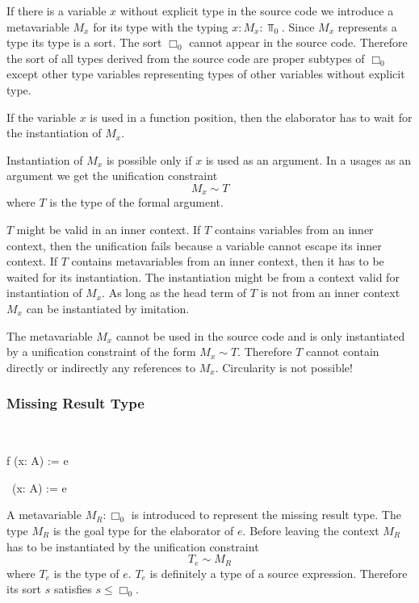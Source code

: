 If there is a variable $x$ without explicit type in the source code we introduce
a metavariable $M_x$ for its type with the typing $x : M_x : \Top_0$. Since
$M_x$ represents a type its type is a sort. The sort $\Box_0$ cannot appear in
the source code. Therefore the sort of all types derived from the source code
are proper subtypes of $\Box_0$ except other type variables representing types
of other variables without explicit type.

If the variable $x$ is used in a function position, then the elaborator has to
wait for the instantiation of $M_x$.

Instantiation of $M_x$ is possible only if $x$ is used as an argument. In a
usages as an argument we get the unification constraint
$$
    M_x \sim T
$$
where $T$ is the type of the formal argument.

$T$ might be valid in an inner context. If $T$ contains variables from an inner
context, then the unification fails because a variable cannot escape its inner
context. If $T$ contains metavariables from an inner context, then it has to be
waited for its instantiation. The instantiation might be from a context valid
for instantiation of $M_x$. As long as the head term of $T$ is not from an inner
context $M_x$ can be instantiated by imitation.

The metavariable $M_x$ cannot be used in the source code and is only
instantiated by a unification constraint of the form $M_x \sim T$. Therefore $T$
cannot contain directly or indirectly any references to $M_x$. Circularity is
not possible!





\subsubsection{Missing Result Type}

\ \begin{alba}
    f (x: A)  := e

    \ (x: A)  := e
\end{alba}

A metavariable $M_R: \Box_0$ is introduced to represent the missing result type.
The type $M_R$ is the goal type for the elaborator of $e$. Before leaving the
context $M_R$ has to be instantiated by the unification constraint
$$
    T_e \sim M_R
$$
where $T_e$ is the type of $e$. $T_e$ is definitely a type of a source
expression. Therefore its sort $s$ satisfies $s \le \Box_0$.


